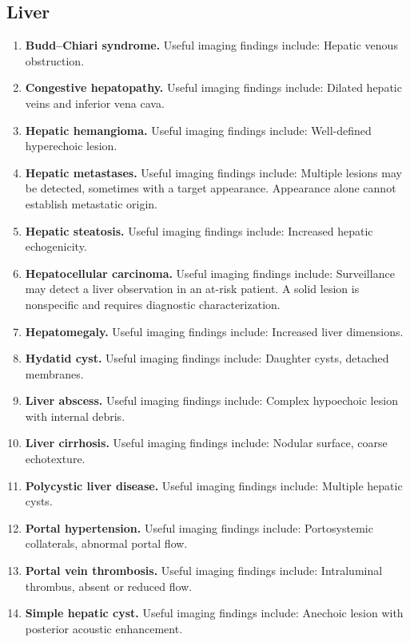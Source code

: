 \subsection{Liver}
\begin{enumerate}[leftmargin=*,itemsep=0.45em,topsep=0.4em]
\item \textbf{Budd--Chiari syndrome.} Useful imaging findings include: Hepatic venous obstruction.
\item \textbf{Congestive hepatopathy.} Useful imaging findings include: Dilated hepatic veins and inferior vena cava.
\item \textbf{Hepatic hemangioma.} Useful imaging findings include: Well-defined hyperechoic lesion.
\item \textbf{Hepatic metastases.} Useful imaging findings include: Multiple lesions may be detected, sometimes with a target appearance. Appearance alone cannot establish metastatic origin.
\item \textbf{Hepatic steatosis.} Useful imaging findings include: Increased hepatic echogenicity.
\item \textbf{Hepatocellular carcinoma.} Useful imaging findings include: Surveillance may detect a liver observation in an at-risk patient. A solid lesion is nonspecific and requires diagnostic characterization.
\item \textbf{Hepatomegaly.} Useful imaging findings include: Increased liver dimensions.
\item \textbf{Hydatid cyst.} Useful imaging findings include: Daughter cysts, detached membranes.
\item \textbf{Liver abscess.} Useful imaging findings include: Complex hypoechoic lesion with internal debris.
\item \textbf{Liver cirrhosis.} Useful imaging findings include: Nodular surface, coarse echotexture.
\item \textbf{Polycystic liver disease.} Useful imaging findings include: Multiple hepatic cysts.
\item \textbf{Portal hypertension.} Useful imaging findings include: Portosystemic collaterals, abnormal portal flow.
\item \textbf{Portal vein thrombosis.} Useful imaging findings include: Intraluminal thrombus, absent or reduced flow.
\item \textbf{Simple hepatic cyst.} Useful imaging findings include: Anechoic lesion with posterior acoustic enhancement.
\end{enumerate}


